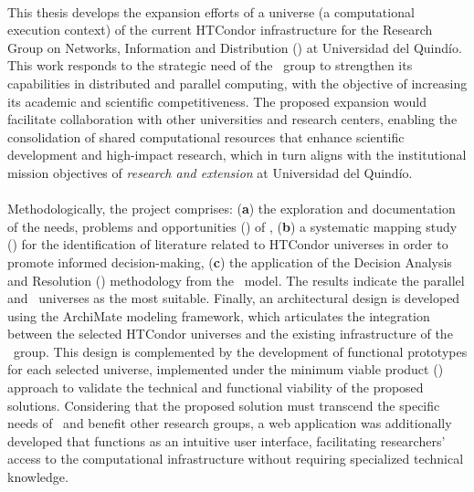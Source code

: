 \label{cap:abstract}
\mbox{}\\
\noindent
This thesis develops the expansion efforts of a universe (\ie a computational execution context) of the current HTCondor infrastructure for the Research Group on Networks, Information and Distribution (\GRID) at Universidad del Quindío. This work responds to the strategic need of the \GRID~group to strengthen its capabilities in distributed and parallel computing, with the objective of increasing its academic and scientific competitiveness. The proposed expansion would facilitate collaboration with other universities and research centers, enabling the consolidation of shared computational resources that enhance scientific development and high-impact research, which in turn aligns with the institutional mission objectives of \textit{research and extension} at Universidad del Quindío.
\\\\
Methodologically, the project comprises: (\textbf{a}) the exploration and documentation of the needs, problems and opportunities (\NPO) of \GRID, (\textbf{b}) a systematic mapping study (\SMS) for the identification of literature related to HTCondor universes in order to promote informed decision-making, (\textbf{c}) the application of the Decision Analysis and Resolution (\DAR) methodology from the \CMMI~model. The results indicate the parallel and \GRID~universes as the most suitable. Finally, an architectural design is developed using the ArchiMate modeling framework, which articulates the integration between the selected HTCondor universes and the existing infrastructure of the \GRID~group. This design is complemented by the development of functional prototypes for each selected universe, implemented under the minimum viable product (\PMV) approach to validate the technical and functional viability of the proposed solutions. Considering that the proposed solution must transcend the specific needs of \GRID~and benefit other research groups, a web application was additionally developed that functions as an intuitive user interface, facilitating researchers' access to the computational infrastructure without requiring specialized technical knowledge.

